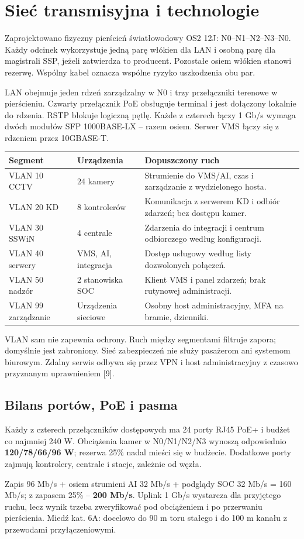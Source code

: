 \section{Sieć transmisyjna i technologie}
Zaprojektowano fizyczny pierścień światłowodowy OS2 12J: N0--N1--N2--N3--N0. Każdy odcinek wykorzystuje jedną parę włókien dla LAN i osobną parę dla magistrali SSP, jeżeli zatwierdza to producent. Pozostałe osiem włókien stanowi rezerwę. Wspólny kabel oznacza wspólne ryzyko uszkodzenia obu par.

LAN obejmuje jeden rdzeń zarządzalny w N0 i trzy przełączniki terenowe w pierścieniu. Czwarty przełącznik PoE obsługuje terminal i jest dołączony lokalnie do rdzenia. RSTP blokuje logiczną pętlę. Każde z czterech łączy 1 Gb/s wymaga dwóch modułów SFP 1000BASE-LX -- razem osiem. Serwer VMS łączy się z rdzeniem przez 10GBASE-T.

\begin{tabularx}{\linewidth}{@{}P{29mm}P{34mm}Y@{}}
\toprule\textbf{Segment} & \textbf{Urządzenia} & \textbf{Dopuszczony ruch}\\\midrule
VLAN 10 CCTV & 24 kamery & Strumienie do VMS/AI, czas i zarządzanie z wydzielonego hosta.\\
VLAN 20 KD & 8 kontrolerów & Komunikacja z serwerem KD i odbiór zdarzeń; bez dostępu kamer.\\
VLAN 30 SSWiN & 4 centrale & Zdarzenia do integracji i centrum odbiorczego według konfiguracji.\\
VLAN 40 serwery & VMS, AI, integracja & Dostęp usługowy według listy dozwolonych połączeń.\\
VLAN 50 nadzór & 2 stanowiska SOC & Klient VMS i panel zdarzeń; brak rutynowej administracji.\\
VLAN 99 zarządzanie & Urządzenia sieciowe & Osobny host administracyjny, MFA na bramie, dzienniki.\\\bottomrule
\end{tabularx}

VLAN sam nie zapewnia ochrony. Ruch między segmentami filtruje zapora; domyślnie jest zabroniony. Sieć zabezpieczeń nie służy pasażerom ani systemom biurowym. Zdalny serwis odbywa się przez VPN i host administracyjny z czasowo przyznanym uprawnieniem [9].

\subsection*{Bilans portów, PoE i pasma}
Każdy z czterech przełączników dostępowych ma 24 porty RJ45 PoE+ i budżet co najmniej 240 W. Obciążenia kamer w N0/N1/N2/N3 wynoszą odpowiednio \textbf{120/78/66/96 W}; rezerwa 25\% nadal mieści się w budżecie. Dodatkowe porty zajmują kontrolery, centrale i stacje, zależnie od węzła.

Zapis 96 Mb/s + osiem strumieni AI 32 Mb/s + podglądy SOC 32 Mb/s = 160 Mb/s; z zapasem 25\% -- \textbf{200 Mb/s}. Uplink 1 Gb/s wystarcza dla przyjętego ruchu, lecz wynik trzeba zweryfikować pod obciążeniem i po przerwaniu pierścienia. Miedź kat. 6A: docelowo do 90 m toru stałego i do 100 m kanału z przewodami przyłączeniowymi.
